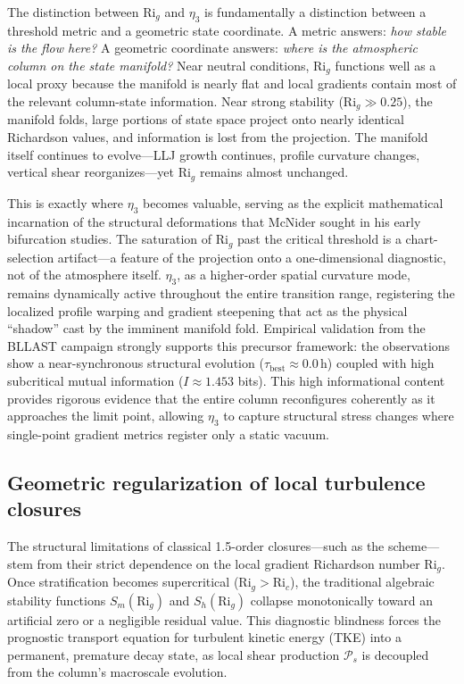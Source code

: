 \documentclass[12pt,a4paper]{article}
\newcommand{\Ric}{\mathrm{Ri}_c}
\newcommand{\Rig}{\mathrm{Ri}_g}
\begin{document}
The distinction between $\Rig$ and $\eta_3$ is fundamentally a distinction between a threshold metric and a geometric state coordinate. A metric answers: \emph{how stable is the flow here?} A geometric coordinate answers: \emph{where is the atmospheric column on the state manifold?} Near neutral conditions, $\Rig$ functions well as a local proxy because the manifold is nearly flat and local gradients contain most of the relevant column-state information. Near strong stability ($\Rig \gg 0.25$), the manifold folds, large portions of state space project onto nearly identical Richardson values, and information is lost from the projection. The manifold itself continues to evolve---LLJ growth continues, profile curvature changes, vertical shear reorganizes---yet $\Rig$ remains almost unchanged.

This is exactly where $\eta_3$ becomes valuable, serving as the explicit mathematical incarnation of the structural deformations that McNider sought in his early bifurcation studies. The saturation of $\Rig$ past the critical threshold is a chart-selection artifact---a feature of the projection onto a one-dimensional diagnostic, not of the atmosphere itself. $\eta_3$, as a higher-order spatial curvature mode, remains dynamically active throughout the entire transition range, registering the localized profile warping and gradient steepening that act as the physical ``shadow'' cast by the imminent manifold fold. Empirical validation from the BLLAST campaign strongly supports this precursor framework: the observations show a near-synchronous structural evolution ($\tau_{\text{best}} \approx 0.0\,\text{h}$) coupled with high subcritical mutual information ($I \approx 1.453$ bits). This high informational content provides rigorous evidence that the entire column reconfigures coherently as it approaches the limit point, allowing $\eta_3$ to capture structural stress changes where single-point gradient metrics register only a static vacuum.

\subsection{Geometric regularization of local turbulence closures}

The structural limitations of classical 1.5-order closures---such as the \citet{yamada1983} scheme---stem from their strict dependence on the local gradient Richardson number $\Rig$. Once stratification becomes supercritical ($\Rig > \Ric$), the traditional algebraic stability functions $S_m(\Rig)$ and $S_h(\Rig)$ collapse monotonically toward an artificial zero or a negligible residual value. This diagnostic blindness forces the prognostic transport equation for turbulent kinetic energy (TKE) into a permanent, premature decay state, as local shear production $\mathcal{P}_s$ is decoupled from the column's macroscale evolution.
\end{document}
